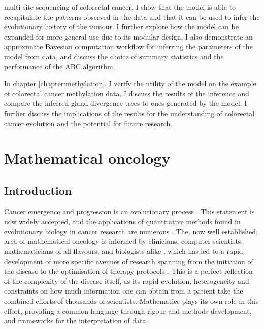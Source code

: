 multi-site sequencing of colorectal cancer. I show that the model is able to
recapitulate the patterns observed in the data and that it can be used to infer
the evolutionary history of the tumour. I further explore how the model can be
expanded for more general use due to its modular design. I also demonstrate an
approximate Bayesian computation workflow for inferring the parameters of the
model from data, and discuss the choice of summary statistics and the
performance of the ABC algorithm.\par
In chapter \ref{chapter:methylation}, I verify the utility of the model on the
example of colorectal cancer methylation data. I discuss the results of the
inference and compare the inferred gland divergence trees to ones generated by
the model. I further discuss the implications of the results for the
understanding of colorectal cancer evolution and the potential for future
research. \par


\section{Mathematical oncology}
\subsection{Introduction}
Cancer emergence and progression is an evolutionary process \cite{nowell_clonal_1976, merlo_cancer_2006}.
This statement is now widely accepted, and the applications of quantitative methods found in evolutionary
biology in cancer research are numerous \cite{rockne_2019_2019, yin_review_2019, kourou_applied_2021}.
The, now well established, area of mathematical oncology is informed by clinicians, computer scientists,
mathematicians of all flavours, and biologists alike \cite{bull_hallmarks_2022}, which has led to a rapid
development of more specific avenues of research spanning from the initiation of the disease
\cite{paterson_mathematical_2020} to the optimisation of therapy protocols
\cite{west_survey_2023}. This is a perfect reflection of the complexity
of the disease itself, as its rapid evolution, heterogeneity and constraints on
how much information one can obtain from a patient take
the combined efforts of thousands of scientists. Mathematics plays its own role in this effort, providing
a common language through rigour and methods development, and frameworks for the interpretation of data.

